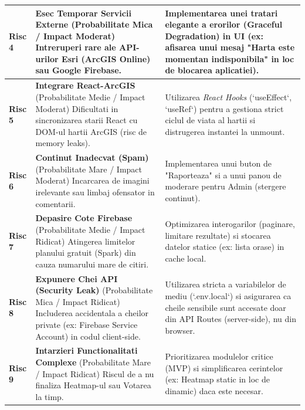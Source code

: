 \documentclass[12pt, a4paper]{article}
\begin{document}
\begin{longtable}{|p{1.8cm}|p{6.6cm}|p{6.6cm}|}
\textbf{Risc 4} & \textbf{Esec Temporar Servicii Externe} \newline (Probabilitate Mica / Impact Moderat) \newline Intreruperi rare ale API-urilor Esri (ArcGIS Online) sau Google Firebase. & Implementarea unei tratari elegante a erorilor (Graceful Degradation) in UI (ex: afisarea unui mesaj "Harta este momentan indisponibila" in loc de blocarea aplicatiei). \\ \hline

\textbf{Risc 5} & \textbf{Integrare React-ArcGIS} \newline (Probabilitate Medie / Impact Moderat) \newline Dificultati in sincronizarea starii React cu DOM-ul hartii ArcGIS (risc de memory leaks). & Utilizarea \textit{React Hooks} (`useEffect`, `useRef`) pentru a gestiona strict ciclul de viata al hartii si distrugerea instantei la unmount. \\ \hline

\textbf{Risc 6} & \textbf{Continut Inadecvat (Spam)} \newline (Probabilitate Mare / Impact Moderat) \newline Incarcarea de imagini irelevante sau limbaj ofensator in comentarii. & Implementarea unui buton de "Raporteaza" si a unui panou de moderare pentru Admin (stergere continut). \\ \hline

\textbf{Risc 7} & \textbf{Depasire Cote Firebase} \newline (Probabilitate Medie / Impact Ridicat) \newline Atingerea limitelor planului gratuit (Spark) din cauza numarului mare de citiri. & Optimizarea interogarilor (paginare, limitare rezultate) si stocarea datelor statice (ex: lista orase) in cache local. \\ \hline

\textbf{Risc 8} & \textbf{Expunere Chei API (Security Leak)} \newline (Probabilitate Mica / Impact Ridicat) \newline Includerea accidentala a cheilor private (ex: Firebase Service Account) in codul client-side. & Utilizarea stricta a variabilelor de mediu (`.env.local`) si asigurarea ca cheile sensibile sunt accesate doar din API Routes (server-side), nu din browser. \\ \hline

\textbf{Risc 9} & \textbf{Intarzieri Functionalitati Complexe} \newline (Probabilitate Mare / Impact Ridicat) \newline Riscul de a nu finaliza Heatmap-ul sau Votarea la timp. & Prioritizarea modulelor critice (MVP) si simplificarea cerintelor (ex: Heatmap static in loc de dinamic) daca este necesar. \\
\end{longtable}
\end{document}
